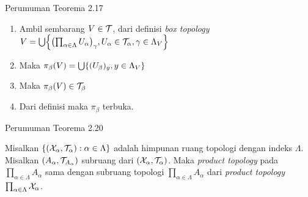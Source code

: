 \begin{frame}{Perumuman Teorema 2.17}
    \begin{tcolorbox}[enhanced,title=Teorema 2.34  (Bukti), frame style tile={width=\paperwidth}{\wallpaper}]
        \begin{enumerate}
            \item Ambil sembarang $V \in \nT$, dari definisi \textit{box topology} $V=\bigcup\set*{\oio*{\prod_{\alpha\in\Lambda}U_\alpha}_\gamma, U_\alpha \in \nT_\alpha, \gamma \in \Lambda_V}$
            \item Maka $\pi_\beta(V) = \bigcup\set*{(U_\beta)_y, y\in\Lambda_V}$
            \item Maka $\pi_\beta(V) \in \nT_\beta$
            \item Dari definisi maka $\pi_\beta$ terbuka.
        \end{enumerate}
    \end{tcolorbox}
\end{frame}


\begin{frame}{Perumuman Teorema 2.20}
    \begin{tcolorbox}[enhanced,title=Teorema 2.35, frame style tile={width=\paperwidth}{\wallpaper}]
        Misalkan $\set*{\oio*{\nX_\alpha,\nT_\alpha}:\alpha \in \Lambda}$ adalah himpunan ruang topologi
        dengan indeks $\Lambda$. Misalkan $\oio*{A_\alpha,\nT_{A_\alpha}}$ subruang dari $\oio*{\nX_\alpha,\nT_\alpha}$.
        Maka \textit{product topology} pada $\prod_{\alpha \in \Lambda}A_\alpha$ sama dengan subruang topologi 
        $\prod_{\alpha \in \Lambda}A_\alpha$ dari \textit{product topology} $\prod_{\alpha \in \Lambda}\nX_\alpha$.
    \end{tcolorbox}
\end{frame}

